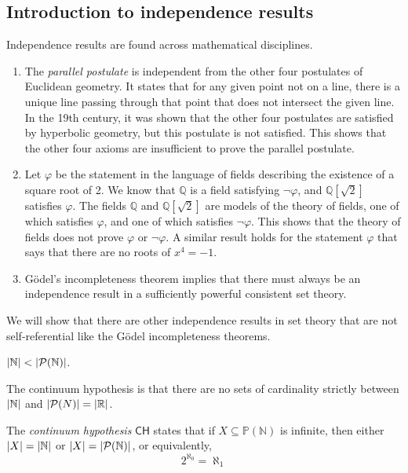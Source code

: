 \subsection{Introduction to independence results}
Independence results are found across mathematical disciplines.
\begin{enumerate}
    \item The \emph{parallel postulate} is independent from the other four postulates of Euclidean geometry.
    It states that for any given point not on a line, there is a unique line passing through that point that does not intersect the given line.
    In the 19th century, it was shown that the other four postulates are satisfied by hyperbolic geometry, but this postulate is not satisfied.
    This shows that the other four axioms are insufficient to prove the parallel postulate.
    \item Let \( \varphi \) be the statement in the language of fields describing the existence of a square root of 2.
    We know that \( \mathbb Q \) is a field satisfying \( \neg\varphi \), and \( \mathbb Q[\sqrt{2}] \) satisfies \( \varphi \).
    The fields \( \mathbb Q \) and \( \mathbb Q[\sqrt{2}] \) are models of the theory of fields, one of which satisfies \( \varphi \), and one of which satisfies \( \neg\varphi \).
    This shows that the theory of fields does not prove \( \varphi \) or \( \neg\varphi \).
    A similar result holds for the statement \( \varphi \) that says that there are no roots of \( x^4 = -1 \).
    \item G\"odel's incompleteness theorem implies that there must always be an independence result in a sufficiently powerful consistent set theory.
\end{enumerate}
We will show that there are other independence results in set theory that are not self-referential like the G\"odel incompleteness theorems.
\begin{theorem}[Cantor]
    \( \abs{\mathbb N} < \abs{\mathcal P(\mathbb N)} \).
\end{theorem}
The continuum hypothesis is that there are no sets of cardinality strictly between \( \abs{\mathbb N} \) and \( \abs{\mathcal P(N)} = \abs{\mathbb R} \).
\begin{definition}
    The \emph{continuum hypothesis} \( \mathsf{CH} \) states that if \( X \subseteq \mathbb P(\mathbb N) \) is infinite, then either \( \abs{X} = \abs{\mathbb N} \) or \( \abs{X} = \abs{\mathcal P(\mathbb N)} \), or equivalently,
    \[ 2^{\aleph_0} = \aleph_1 \]
\end{definition}
